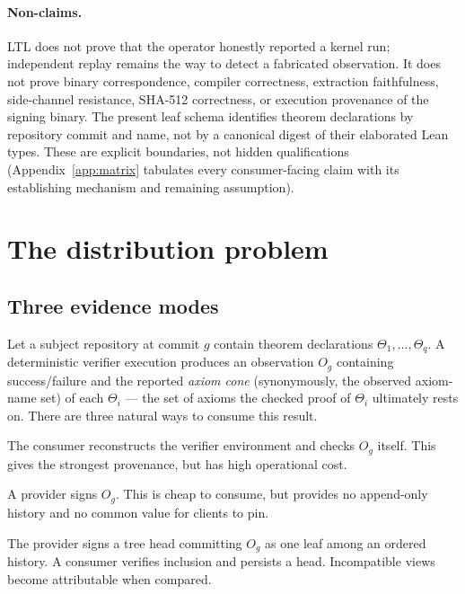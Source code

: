 \documentclass[11pt]{article}
\theoremstyle{remark}
\begin{document}
\paragraph{Non-claims.}
LTL does not prove that the operator honestly reported a kernel run; independent
replay remains the way to detect a fabricated observation. It does not prove
binary correspondence, compiler correctness, extraction faithfulness,
side-channel resistance, SHA-512 correctness, or execution provenance of the
signing binary. The present leaf schema identifies theorem declarations by
repository commit and name, not by a canonical digest of their elaborated Lean
types. These are explicit boundaries, not hidden qualifications
(Appendix~\ref{app:matrix} tabulates every consumer-facing claim with its
establishing mechanism and remaining assumption).

\section{The distribution problem}\label{sec:problem}

\subsection{Three evidence modes}

Let a subject repository at commit $g$ contain theorem declarations
$\Theta_1,\dots,\Theta_q$. A deterministic verifier execution produces an observation
$O_g$ containing success/failure and the reported \emph{axiom cone} (synonymously, the observed axiom-name set) of each
$\Theta_i$ --- the set of axioms the checked proof of $\Theta_i$ ultimately rests on. There are three natural ways to consume this result.

\begin{description}[leftmargin=1.5em,itemsep=4pt]
\item[Direct replay.] The consumer reconstructs the verifier environment and
checks $O_g$ itself. This gives the strongest provenance, but has high
operational cost.
\item[Detached attestation.] A provider signs $O_g$. This is cheap to consume,
but provides no append-only history and no common value for clients to pin.
\item[Transparent attestation.] The provider signs a tree head committing
$O_g$ as one leaf among an ordered history. A consumer verifies inclusion and
persists a head. Incompatible views become attributable when compared.
\end{description}
\end{document}
